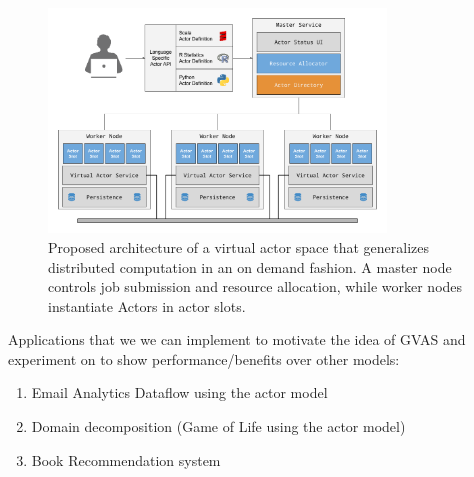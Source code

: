 \documentclass[11pt,letterpaper]{article}
\begin{document}
\begin{figure}[h]
	\centering
    \includegraphics[width=0.8\textwidth]{figures/architecture.png}
    \caption{\textsf{Proposed architecture of a virtual actor space that generalizes distributed computation in an on demand fashion. A master node controls job submission and resource allocation, while worker nodes instantiate Actors in actor slots.}}
    \label{fig:performance}
\end{figure}

Applications that we we can implement to motivate the idea of GVAS and experiment on to show performance/benefits over other models:

\begin{enumerate}
	\item Email Analytics Dataflow using the actor model
	\item Domain decomposition (Game of Life using the actor model)
	\item Book Recommendation system
\end{enumerate}



\end{document}
